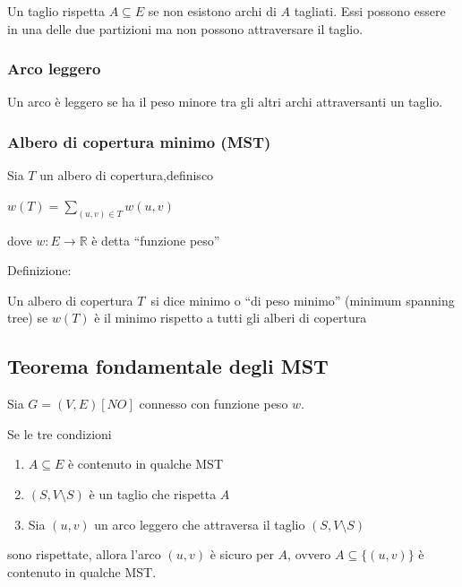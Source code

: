 \documentclass{article}
\providecommand{\tightlist}{%
  \setlength{\itemsep}{0pt}\setlength{\parskip}{0pt}}
\begin{document}
{{{{}

{Un taglio rispetta $A \subseteq E$ se non esistono archi di $A$ tagliati. Essi possono essere in una delle due partizioni ma non possono attraversare il taglio.}

\hypertarget{h.gfycwx7ubmbv}{\subsubsection{\texorpdfstring{{Arco
leggero}}{Arco leggero}}\label{h.gfycwx7ubmbv}}

{Un arco è leggero se ha il peso minore tra gli altri archi attraversanti un taglio.}

\hypertarget{h.1evqcdl7exzv}{\subsubsection{\texorpdfstring{{Albero di copertura minimo (MST)}}{Albero di copertura minimo (MST)}}\label{h.1evqcdl7exzv}}

{Sia $T$ un albero di copertura,definisco}

$w(T) = \sum_{(u,v)\in T}{w(u,v)}$

{dove $w:E\rightarrow \mathbb{R}$ è detta ``funzione peso''
}

{Definizione:}

{Un albero di copertura }$T${~si dice minimo o ``di peso minimo'' (minimum spanning tree) se $w(T)$ è il minimo rispetto a tutti gli alberi di copertura}

\subsection{Teorema fondamentale degli MST}

{Sia $G=(V,E) [NO]$ connesso con funzione peso $w$.}

{Se le tre condizioni}

\begin{enumerate}
\tightlist
\item
  {$A \subseteq E$ è contenuto in qualche MST}
\item
  {$(S,V \setminus S)$ è un taglio che rispetta $A$}
\item
  {Sia $(u,v)$ un arco leggero che attraversa il taglio $(S,V \setminus S)$}
\end{enumerate}

{sono rispettate, allora l'arco $(u,v)$ è sicuro per $A$, ovvero $A \subseteq \{(u,v)\}$ è contenuto in qualche MST.}

}}}
\end{document}
